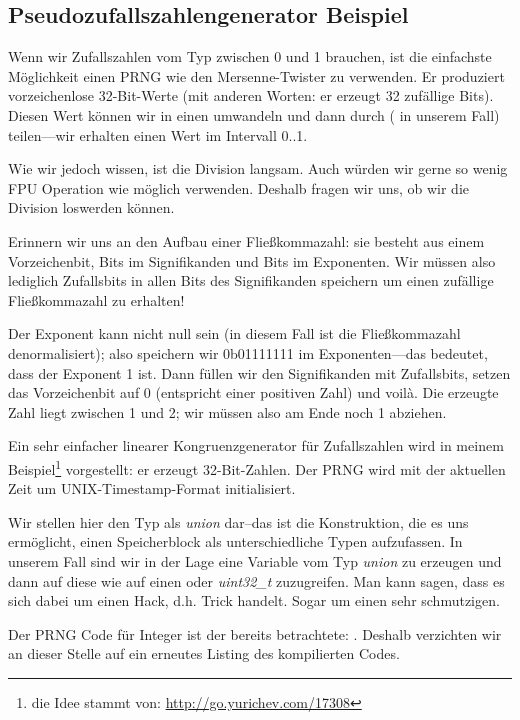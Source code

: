 \subsection{Pseudozufallszahlengenerator Beispiel}
\label{FPU_PRNG}
Wenn wir Zufallszahlen vom Typ \Tfloat zwischen 0 und 1 brauchen, ist die einfachste Möglichkeit einen \ac{PRNG} wie den
Mersenne-Twister zu verwenden.
Er produziert vorzeichenlose 32-Bit-Werte (mit anderen Worten: er erzeugt 32 zufällige Bits).
Diesen Wert können wir in einen \Tfloat umwandeln und dann durch  ( in unserem Fall)
teilen---wir erhalten einen Wert im Intervall 0..1.

Wie wir jedoch wissen, ist die Division langsam.
Auch würden wir gerne so wenig FPU Operation wie möglich verwenden.
Deshalb fragen wir uns, ob wir die Division loswerden können.

Erinnern wir uns an den Aufbau einer Fließkommazahl: sie besteht aus einem Vorzeichenbit, Bits im Signifikanden und Bits
im Exponenten.
Wir müssen also lediglich Zufallsbits in allen Bits des Signifikanden speichern um einen zufällige Fließkommazahl zu
erhalten!

Der Exponent kann nicht null sein (in diesem Fall ist die Fließkommazahl denormalisiert); also speichern wir 0b01111111
im Exponenten---das bedeutet, dass der Exponent 1 ist.
Dann füllen wir den Signifikanden mit Zufallsbits, setzen das Vorzeichenbit auf 0 (entspricht einer positiven Zahl) und
voilà.
Die erzeugte Zahl liegt zwischen 1 und 2; wir müssen also am Ende noch 1 abziehen.

\newcommand{\URLXOR}{\url{http://go.yurichev.com/17308}}
Ein sehr einfacher linearer Kongruenzgenerator für Zufallszahlen wird in meinem Beispiel\footnote{die Idee stammt von:
\URLXOR} vorgestellt: er erzeugt 32-Bit-Zahlen.
Der \ac{PRNG} wird mit der aktuellen Zeit um UNIX-Timestamp-Format initialisiert.

Wir stellen hier den Typ \Tfloat als \emph{union} dar--das ist die \CCpp Konstruktion, die es uns ermöglicht, einen
Speicherblock als unterschiedliche Typen aufzufassen.
In unserem Fall sind wir in der Lage eine Variable vom Typ \emph{union} zu erzeugen und dann auf diese wie auf einen
\Tfloat oder \emph{uint32\_t} zuzugreifen.
Man kann sagen, dass es sich dabei um einen Hack, d.h. Trick handelt. Sogar um einen sehr schmutzigen.

Der \ac{PRNG} Code für Integer ist der bereits betrachtete: .
Deshalb verzichten wir an dieser Stelle auf ein erneutes Listing des kompilierten Codes.

